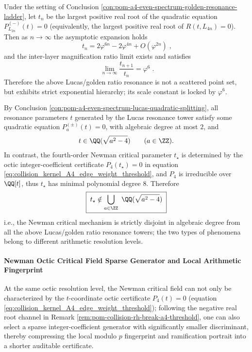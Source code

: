 \begin{conclusion}\label{con:pom-a4-even-spectrum-resonance-scale-law}
Under the setting of Conclusion \ref{con:pom-a4-even-spectrum-golden-resonance-ladder}, let \(t_n\) be the largest positive real root of the quadratic equation \(P_{L_{2n}}^{(-)}(t)=0\) (equivalently, the largest positive real root of \(R(t,L_{4n})=0\)).
Then as \(n\to\infty\) the asymptotic expansion holds
\[
\boxed{\;
t_n=2\varphi^{6n}-2\varphi^{4n}+O(\varphi^{2n})\; } ,
\]
and the inter-layer magnification ratio limit exists and satisfies
\[
\boxed{\;
\lim_{n\to\infty}\frac{t_{n+1}}{t_n}=\varphi^6\; } .
\]
Therefore the above Lucas/golden ratio resonance is not a scattered point set, but exhibits strict exponential hierarchy; its scale constant is locked by \(\varphi^6\).
\end{conclusion}
\begin{conclusion}\label{con:pom-a4-even-spectrum-resonance-vs-newman-separation}
By Conclusion \ref{con:pom-a4-even-spectrum-lucas-quadratic-splitting}, all resonance parameters \(t\) generated by the Lucas resonance tower satisfy some quadratic equation \(P_a^{(\pm)}(t)=0\), with algebraic degree at most \(2\), and
\[
t\in\QQ(\sqrt{a^2-4})
\qquad(a\in\ZZ).
\]
In contrast, the fourth-order Newman critical parameter \(t_\star\) is determined by the octic integer-coefficient certificate \(P_4(t_\star)=0\) in equation \eqref{eq:collision_kernel_A4_edge_weight_threshold}, and \(P_4\) is irreducible over \(\QQ[t]\), thus \(t_\star\) has minimal polynomial degree \(8\).
Therefore
\[
\boxed{\;
t_\star\notin \bigcup_{a\in\ZZ}\ \QQ(\sqrt{a^2-4})\;}
\]
i.e., the Newman critical mechanism is strictly disjoint in algebraic degree from all the above Lucas/golden ratio resonance towers; the two types of phenomena belong to different arithmetic resolution levels.
\end{conclusion}

%
\paragraph{Newman Octic Critical Field Sparse Generator and Local Arithmetic Fingerprint}
At the same octic resolution level, the Newman critical field can not only be characterized by the \(t\)-coordinate octic certificate \(P_4(t)=0\) (equation \eqref{eq:collision_kernel_A4_edge_weight_threshold});
following the negative real root channel in Remark \ref{rem:pom-collision-rh-break-a4-threshold}, one can also select a sparse integer-coefficient generator with significantly smaller discriminant, thereby compressing the local modulo \(p\) fingerprint and ramification portrait into a shorter auditable certificate.

